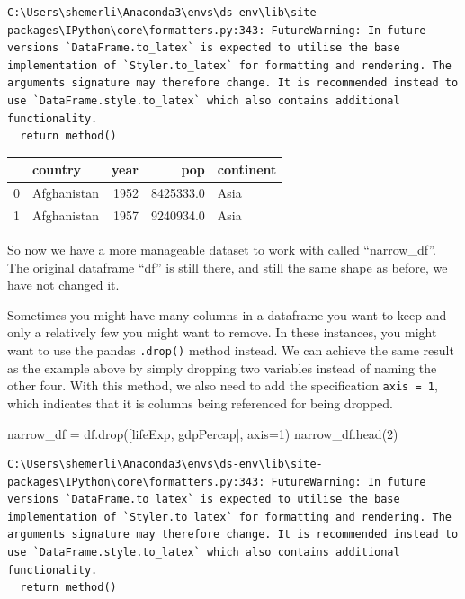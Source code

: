 \documentclass[
  letterpaper,
  DIV=11,
  numbers=noendperiod]{scrreprt}
\newenvironment{Shaded}{\begin{snugshade}}{\end{snugshade}}
\newcommand{\DecValTok}[1]{\textcolor[rgb]{0.68,0.00,0.00}{#1}}
\newcommand{\NormalTok}[1]{\textcolor[rgb]{0.00,0.23,0.31}{#1}}
\newcommand{\OperatorTok}[1]{\textcolor[rgb]{0.37,0.37,0.37}{#1}}
\newcommand{\StringTok}[1]{\textcolor[rgb]{0.13,0.47,0.30}{#1}}
\begin{document}
\begin{verbatim}
C:\Users\shemerli\Anaconda3\envs\ds-env\lib\site-packages\IPython\core\formatters.py:343: FutureWarning: In future versions `DataFrame.to_latex` is expected to utilise the base implementation of `Styler.to_latex` for formatting and rendering. The arguments signature may therefore change. It is recommended instead to use `DataFrame.style.to_latex` which also contains additional functionality.
  return method()
\end{verbatim}

\begin{tabular}{llrrl}
\toprule
{} &      country &  year &        pop & continent \\
\midrule
0 &  Afghanistan &  1952 &  8425333.0 &      Asia \\
1 &  Afghanistan &  1957 &  9240934.0 &      Asia \\
\bottomrule
\end{tabular}

So now we have a more manageable dataset to work with called
``narrow\_df''. The original dataframe ``df'' is still there, and still
the same shape as before, we have not changed it.

Sometimes you might have many columns in a dataframe you want to keep
and only a relatively few you might want to remove. In these instances,
you might want to use the pandas \texttt{.drop()} method instead. We can
achieve the same result as the example above by simply dropping two
variables instead of naming the other four. With this method, we also
need to add the specification \texttt{axis\ =\ 1}, which indicates that
it is columns being referenced for being dropped.

\begin{Shaded}
\begin{Highlighting}[]
\NormalTok{narrow\_df }\OperatorTok{=}\NormalTok{ df.drop([}\StringTok{\textquotesingle{}lifeExp\textquotesingle{}}\NormalTok{, }\StringTok{\textquotesingle{}gdpPercap\textquotesingle{}}\NormalTok{], axis}\OperatorTok{=}\DecValTok{1}\NormalTok{)}
\NormalTok{narrow\_df.head(}\DecValTok{2}\NormalTok{)}
\end{Highlighting}
\end{Shaded}

\begin{verbatim}
C:\Users\shemerli\Anaconda3\envs\ds-env\lib\site-packages\IPython\core\formatters.py:343: FutureWarning: In future versions `DataFrame.to_latex` is expected to utilise the base implementation of `Styler.to_latex` for formatting and rendering. The arguments signature may therefore change. It is recommended instead to use `DataFrame.style.to_latex` which also contains additional functionality.
  return method()
\end{verbatim}
\end{document}

